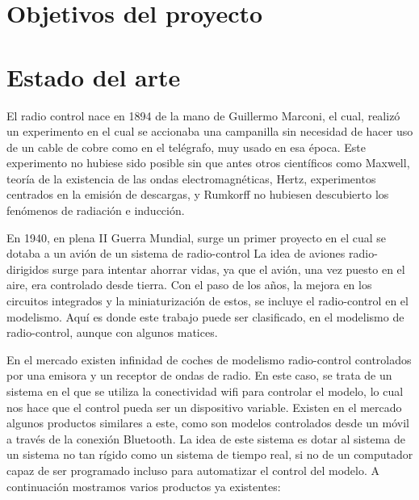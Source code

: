 \documentclass{pclass}
\begin{document}
\section{Objetivos del proyecto}
\section{Estado del arte}
El radio control nace en 1894 de la mano de Guillermo Marconi, el cual, realizó un experimento en el cual se accionaba una campanilla sin necesidad de hacer uso de un cable de cobre como en el telégrafo, muy usado en esa época. Este experimento no hubiese sido posible sin que antes otros científicos como Maxwell, teoría de la existencia de las ondas electromagnéticas, Hertz, experimentos centrados en la emisión de descargas, y Rumkorff no hubiesen descubierto los fenómenos de radiación e inducción.

En 1940, en plena II Guerra Mundial, surge un primer proyecto en el cual se dotaba a un avión de un sistema de radio-control La idea de aviones radio-dirigidos surge para intentar ahorrar vidas, ya que el avión, una vez puesto en el aire, era controlado desde tierra. Con el paso de los años, la mejora en los circuitos integrados y la miniaturización de estos, se incluye el radio-control en el modelismo. Aquí es donde este trabajo puede ser clasificado, en el modelismo de radio-control, aunque con algunos matices.

En el mercado existen infinidad de coches de modelismo radio-control controlados por una emisora y un receptor de ondas de radio. En este caso, se trata de un sistema en el que se utiliza la conectividad wifi para controlar el modelo, lo cual nos hace que el control pueda ser un dispositivo variable. Existen en el mercado algunos productos similares a este, como son modelos controlados desde un móvil a través de la conexión Bluetooth. La idea de este sistema es dotar al sistema de un sistema no tan rígido como un sistema de tiempo real, si no de un computador capaz de ser programado incluso para automatizar el control del modelo. A continuación mostramos varios productos ya existentes:
\end{document}
